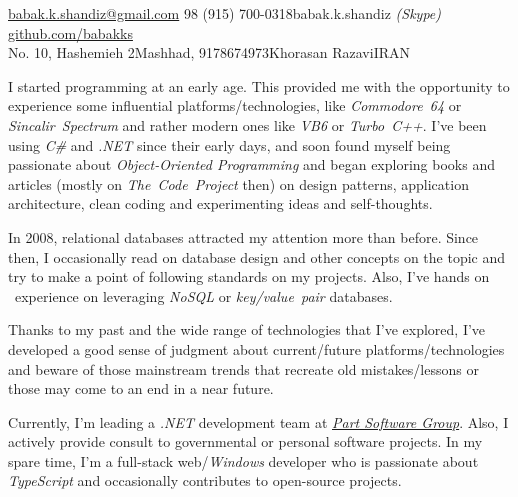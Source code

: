 \documentclass[10pt,a4paper]{article} %
\begin{document}
 



\noindent\href{mailto:babak.k.shandiz@gmail.com}{babak.k.shandiz@gmail.com}\bull %
\textsmaller{+}98 (915) 700-0318\bull babak.k.shandiz \textit{(Skype)}\bull %
\href{http://github.com/babakks}{github.com/babakks}\\ %
No. 10, Hashemieh 2\bull Mashhad, 9178674973\bull Khorasan Razavi\bull IRAN %

\spacedhrule{0.9em}{-0.4em} %



\vspace{-1.3em} %

\begin{multicols}{2}  %
\noindent
I started programming at an early age. This provided me with the opportunity to
experience some influential platforms/technologies, like \textit{Commodore~64}
or \textit{Sincalir~Spectrum} and rather modern ones like \textit{VB6} or
\textit{Turbo~C++}. I've been using \textit{C\#} and \textit{.NET}
since their early days, and soon found myself being passionate about
\textit{Object-Oriented Programming} and began exploring books and articles
(mostly on \textit{The~Code~Project} then) on design patterns, application
architecture, clean coding  and experimenting ideas and self-thoughts.

In 2008, relational databases attracted my attention more than before. Since
then, I occasionally read on database design and other concepts on the topic and
try to make a point of following standards on my projects. Also, I've hands on \
experience on leveraging \textit{NoSQL} or \textit{key/value~pair} databases.

Thanks to my past and the wide range of technologies that I've explored, I've
developed a good sense of judgment about current/future platforms/technologies
and beware of those mainstream trends that recreate old mistakes/lessons or
those may come to an end in a near future.

Currently, I'm leading a \textit{.NET} development team at
\href{www.partdp.ir}{\textit{Part Software Group}}.
Also, I actively provide consult to governmental or personal
software projects. In my spare time, I'm a full-stack web/\textit{Windows} developer
who is passionate about \textit{TypeScript} and occasionally contributes to
open-source projects.
\end{multicols}
\end{document}
